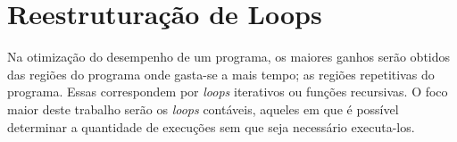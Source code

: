 
\chapter{Reestruturação de Loops}

Na otimização do desempenho de um programa, os maiores ganhos serão obtidos das 
regiões do programa onde gasta-se a mais tempo; as regiões repetitivas do
programa.
Essas correspondem por \textit{loops} iterativos ou funções recursivas.
O foco maior deste trabalho serão os \textit{loops} contáveis, aqueles em que é
possível determinar a quantidade de execuções sem que seja necessário
executa-los.



